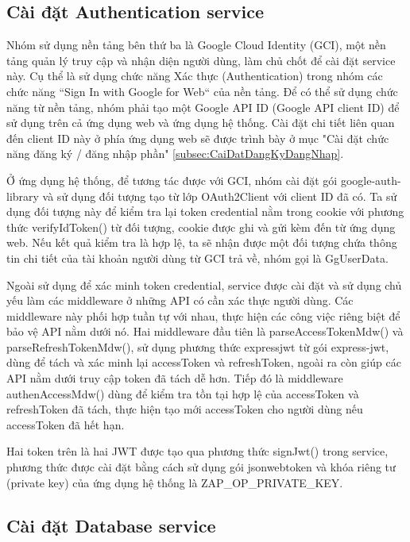 \subsection{Cài đặt Authentication service}

\tab Nhóm sử dụng nền tảng bên thứ ba là Google Cloud Identity (GCI), một nền tảng quản lý truy cập và nhận diện người dùng, làm chủ chốt để cài đặt service này.
Cụ thể là sử dụng chức năng Xác thực (Authentication) trong nhóm các chức năng “Sign In with Google for Web“ của nền tảng.
Để có thể sử dụng chức năng từ nền tảng, nhóm phải tạo một Google API ID (Google API client ID) để sử dụng trên cả ứng dụng web và ứng dụng hệ thống.
Cài đặt chi tiết liên quan đến client ID này ở phía ứng dụng web sẽ được trình bày ở mục "Cài đặt chức năng đăng ký / đăng nhập phần" \ref{subsec:CaiDatDangKyDangNhap}.
\par

Ở ứng dụng hệ thống, để tương tác được với GCI, nhóm cài đặt gói google-auth-library và sử dụng đối tượng tạo từ lớp OAuth2Client với client ID đã có. Ta sử dụng đối tượng này để kiểm tra lại token credential nằm trong cookie với phương thức verifyIdToken() từ đối tượng, cookie được ghi và gửi kèm đến từ ứng dụng web. Nếu kết quả kiểm tra là hợp lệ, ta sẽ nhận được một đối tượng chứa thông tin chi tiết của tài khoản người dùng từ GCI trả về, nhóm gọi là GgUserData.
\par

Ngoài sử dụng để xác minh token credential, service được cài đặt và sử dụng chủ yếu làm các middleware ở những API có cần xác thực người dùng. Các middleware này phối hợp tuần tự với nhau, thực hiện các công việc riêng biệt để bảo vệ API nằm dưới nó. Hai middleware đầu tiên là parseAccessTokenMdw() và parseRefreshTokenMdw(), sử dụng phương thức expressjwt từ gói express-jwt, dùng để tách và xác minh lại accessToken và refreshToken, ngoài ra còn giúp các API nằm dưới truy cập token đã tách dễ hơn. Tiếp đó là middleware authenAccessMdw() dùng để kiểm tra tồn tại hợp lệ của accessToken và refreshToken đã tách, thực hiện tạo mới accessToken cho người dùng nếu accessToken đã hết hạn.
\par

Hai token trên là hai JWT được tạo qua phương thức signJwt() trong service, phương thức được cài đặt bằng cách sử dụng gói jsonwebtoken và khóa riêng tư (private key) của ứng dụng hệ thống là ZAP\_OP\_PRIVATE\_KEY.

\subsection{Cài đặt Database service}

